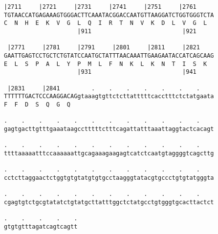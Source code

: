 \documentclass{article}
\begin{document}
\begin{Verbatim}[fontfamily=courier]
 |2711     |2721     |2731     |2741     |2751     |2761    
TGTAACCATGAGAAAGTGGGACTTCAAATACGGACCAATGTTAAGGATCTGGTGGGTCTA
C  N  H  E  K  V  G  L  Q  I  R  T  N  V  K  D  L  V  G  L  
                     |911                          |921     

 |2771     |2781     |2791     |2801     |2811     |2821    
GAATTGAGTCCTGCTCTGTATCCAATGCTATTTAACAAATTGAAGAATACCATCAGCAAG
E  L  S  P  A  L  Y  P  M  L  F  N  K  L  K  N  T  I  S  K  
                     |931                          |941     

 |2831     |2841         .    .    .    .    .    .    .    
TTTTTTGACTCCCAAGGACAGgtaaagtgttctcttatttttcacctttctctatgaata
F  F  D  S  Q  G  Q                                         

.    .    .    .    .    .    .    .    .    .    .    .    
gagtgacttgtttgaaataagcctttttctttcagattatttaaattaggtactcacagt

.    .    .    .    .    .    .    .    .    .    .    .    
ttttaaaaatttccaaaaaattgcagaaagaagagtcatctcaatgtaggggtcagcttg

.    .    .    .    .    .    .    .    .    .    .    .    
cctcttaggaactctggtgtgtatgtgtgcctaagggtatacgtgccctgtgtatgggta

.    .    .    .    .    .    .    .    .    .    .    .    
cgagtgtctgcgtatatctgtatgcttatttggctctatgcctgtgggtgcacttactct

.    .    .    .    .
gtgtgtttagatcagtcagtt
\end{Verbatim}
\newpage
\end{document}
